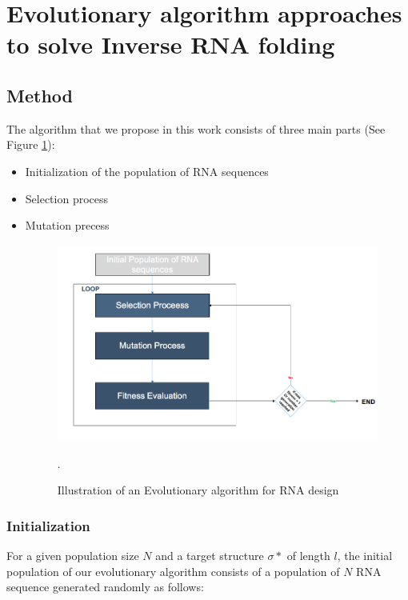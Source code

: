 \documentclass[english,12pt,a4paper]{article}
\theoremstyle{definition}
\begin{document}
	\section{ Evolutionary algorithm approaches to solve Inverse RNA folding}

	\subsection{Method}
The algorithm that we propose in this work consists of three main parts (See Figure \ref{Fig:model}): 

\begin{itemize}
	
	\item  Initialization of the population of RNA sequences 
	\item Selection process
	\item Mutation precess
\begin{figure}[H]
		\centering
		\includegraphics[width=.9\linewidth]{images/model.png}
		\caption{Illustration of an Evolutionary algorithm for RNA design}\label{Fig:model}
		\medskip
		\small.
\end{figure}
	
	
\end{itemize}

\subsubsection{Initialization}
\label{sec:initialization}
For a given population size $N$ and a target structure $\sigma*$ of length $l$, the initial population of our evolutionary algorithm consists of a population of $N$ RNA sequence generated randomly as follows: 
\end{document}
